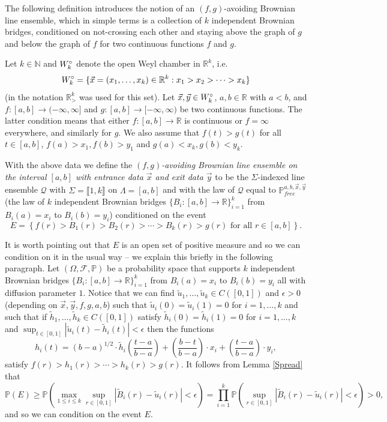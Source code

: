 The following definition introduces the notion of an $(f,g)$-avoiding Brownian line ensemble, which in simple terms is a collection of $k$ independent Brownian bridges, conditioned on not-crossing each other and staying above the graph of $g$ and below the graph of $f$ for two continuous functions $f$ and $g$.
\begin{definition}\label{DefAvoidingLaw}
Let $k \in \mathbb{N}$ and $W^\circ_k$ denote the open Weyl chamber in $\mathbb{R}^k$, i.e.
$$W^\circ_k = \{ \vec{x} = (x_1, \dots, x_k) \in \mathbb{R}^k: x_1 > x_2 > \cdots > x_k \}$$
(in \cite{CorHamA} the notation $\mathbb{R}_{>}^k$ was used for this set).
Let $\vec{x}, \vec{y} \in W^\circ_k$, $a,b \in \mathbb{R}$ with $a < b$, and $f: [a,b] \rightarrow (-\infty, \infty]$ and $g: [a,b] \rightarrow [-\infty, \infty)$ be two continuous functions. The latter condition means that either $f: [a,b] \rightarrow \mathbb{R}$ is continuous or $f = \infty$ everywhere, and similarly for $g$. We also assume that $f(t) > g(t)$ for all $t \in[a,b]$, $f(a) > x_1, f(b) > y_1$ and $g(a) < x_k, g(b) < y_k.$

With the above data we define the {\em $(f,g)$-avoiding Brownian line ensemble on the interval $[a,b]$ with entrance data $\vec{x}$ and exit data $\vec{y}$} to be the $\Sigma$-indexed line ensemble $\mathcal{Q}$ with $\Sigma = \llbracket 1, k\rrbracket$ on $\Lambda = [a,b]$ and with the law of $\mathcal{Q}$ equal to $\mathbb{P}^{a,b, \vec{x},\vec{y}}_{free}$ (the law of $k$ independent Brownian bridges $\{B_i: [a,b] \rightarrow \mathbb{R} \}_{i = 1}^k$ from $B_i(a) = x_i$ to $B_i(b) = y_i$) conditioned on the event 
$$E  = \left\{ f(r) > B_1(r) > B_2(r) > \cdots > B_k(r) > g(r) \mbox{ for all $r \in[a,b]$} \right\}.$$ 

It is worth pointing out that $E$ is an open set of positive measure and so we can condition on it in the usual way -- we explain this briefly in the following paragraph.  Let $\left(\Omega, \mathcal{F}, \mathbb{P}\right)$ be a probability space that supports $k$ independent Brownian bridges $\{B_i: [a,b] \rightarrow \mathbb{R} \}_{i = 1}^k$ from $B_i(a) = x_i$ to $B_i(b) = y_i$ all with diffusion parameter $1$. Notice that we can find $\tilde{u}_1, \dots, \tilde{u}_k \in C([0,1])$ and $\epsilon > 0$ (depending on $\vec{x}, \vec{y}, f, g, a, b$) such that $\tilde{u}_i(0) = \tilde{u}_i(1) = 0$ for $i = 1, \dots, k$ and such that if $\tilde{h}_1, \dots, \tilde{h}_k \in C([0,1])$ satisfy $\tilde{h}_i(0) = \tilde{h}_i(1) = 0$ for $i = 1, \dots, k$ and $\sup_{t \in [0,1]}|\tilde{u}_i(t) - \tilde{h}_i(t)| < \epsilon$ then the functions
$$h_i(t) = (b-a)^{1/2} \cdot \tilde{h}_i \left( \frac{t - a}{b-a} \right) + \left(\frac{b-t}{b-a} \right) \cdot x_i + \left( \frac{t- a}{b-a}\right) \cdot y_i,$$ 
satisfy $f(r) > h_1(r) > \cdots > h_k(r) > g(r)$. It follows from Lemma \ref{Spread} that 
$$\mathbb{P}(E) \geq \mathbb{P}\left(\max_{1 \leq i \leq k} \sup_{r \in [0,1]}|\tilde{B}_i(r) - \tilde{u}_i(r)| < \epsilon \right) = \prod_{i = 1}^k \mathbb{P} \left( \sup_{r \in [0,1]}|\tilde{B}_i(r) - \tilde{u}_i(r)| < \epsilon  \right)> 0,$$
 and so we can condition on the event $E$. 


\end{definition}
